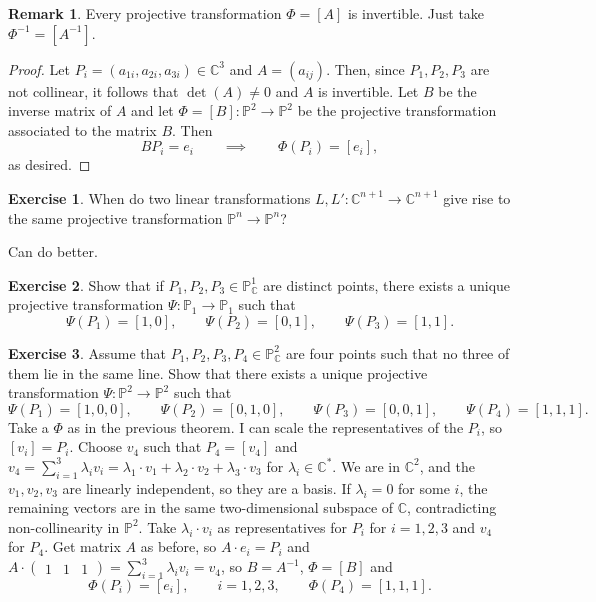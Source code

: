 \documentclass{article}
\newcommand{\C}{\mathbb{C}}
\renewcommand{\P}{\mathbb{P}}
\newcommand{\rb}[1]{\left( #1 \right)}
\renewcommand{\sb}[1]{\left[ #1 \right]}
\newcommand{\three}[3]{\begin{pmatrix} #1 & #2 & #3 \end{pmatrix}}
\theoremstyle{definition}\newtheorem{definition}{Definition}[section]
\theoremstyle{definition}\newtheorem{notation}[definition]{Notation}
\theoremstyle{definition}\newtheorem{remark}[definition]{Remark}
\theoremstyle{definition}\newtheorem{example}[definition]{Example}
\theoremstyle{definition}\newtheorem{fact}{Fact}
\theoremstyle{definition}\newtheorem{exercise}{Exercise}
\begin{document}
\begin{remark}
Every projective transformation $ \Phi = \sb{A} $ is invertible. Just take $ \Phi^{-1} = \sb{A^{-1}} $.
\end{remark}

\begin{proof}
Let $ P_i = \rb{a_{1i}, a_{2i}, a_{3i}} \in \C^3 $ and $ A = \rb{a_{ij}} $. Then, since $ P_1, P_2, P_3 $ are not collinear, it follows that $ \det\rb{A} \ne 0 $ and $ A $ is invertible. Let $ B $ be the inverse matrix of $ A $ and let $ \Phi = \sb{B} : \P^2 \to \P^2 $ be the projective transformation associated to the matrix $ B $. Then
$$ BP_i = e_i \qquad \implies \qquad \Phi\rb{P_i} = \sb{e_i}, $$
as desired.
\end{proof}

\begin{exercise}
When do two linear transformations $ L, L' : \C^{n + 1} \to \C^{n + 1} $ give rise to the same projective transformation $ \P^n \to \P^n $?
\end{exercise}

Can do better.

\begin{exercise}
Show that if $ P_1, P_2, P_3 \in \P^1_\C $ are distinct points, there exists a unique projective transformation $ \Psi : \P_1 \to \P_1 $ such that
$$ \Psi\rb{P_1} = \sb{1, 0}, \qquad \Psi\rb{P_2} = \sb{0, 1}, \qquad \Psi\rb{P_3} = \sb{1, 1}. $$
\end{exercise}

\begin{exercise}
Assume that $ P_1, P_2, P_3, P_4 \in \P^2_\C $ are four points such that no three of them lie in the same line. Show that there exists a unique projective transformation $ \Psi : \P^2 \to \P^2 $ such that
$$ \Psi\rb{P_1} = \sb{1, 0, 0}, \qquad \Psi\rb{P_2} = \sb{0, 1, 0}, \qquad \Psi\rb{P_3} = \sb{0, 0, 1}, \qquad \Psi\rb{P_4} = \sb{1, 1, 1}. $$
Take a $ \Phi $ as in the previous theorem. I can scale the representatives of the $ P_i $, so $ \sb{v_i} = P_i $. Choose $ v_4 $ such that $ P_4 = \sb{v_4} $ and $ v_4 = \sum_{i = 1}^3 \lambda_i v_i = \lambda_1 \cdot v_1 + \lambda_2 \cdot v_2 + \lambda_3 \cdot v_3 $ for $ \lambda_i \in \C^* $. We are in $ \C^2 $, and the $ v_1, v_2, v_3 $ are linearly independent, so they are a basis. If $ \lambda_i = 0 $ for some $ i $, the remaining vectors are in the same two-dimensional subspace of $ \C $, contradicting non-collinearity in $ \P^2 $. Take $ \lambda_i \cdot v_i $ as representatives for $ P_i $ for $ i = 1, 2, 3 $ and $ v_4 $ for $ P_4 $. Get matrix $ A $ as before, so $ A \cdot e_i = P_i $ and $ A \cdot \three{1}{1}{1} = \sum_{i = 1}^3 \lambda_iv_i = v_4 $, so $ B = A^{-1} $, $ \Phi = \sb{B} $ and
$$ \Phi\rb{P_i} = \sb{e_i}, \qquad i = 1, 2, 3, \qquad \Phi\rb{P_4} = \sb{1, 1, 1}. $$
\end{exercise}
\end{document}
